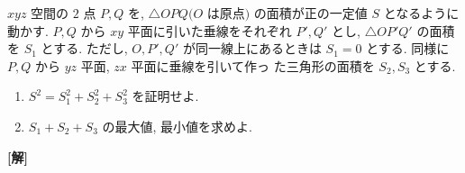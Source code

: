 \documentclass[a4paper,10pt]{ltjsarticle}
\begin{document}
\begin{oframed}
  $xyz$ 空間の $2$ 点 $P, Q$ を, $\triangle OPQ (O$ は原点$)$ の面積が正の一定値 $S$ となるように動かす. $P, Q$ から $xy$ 平面に引いた垂線をそれぞれ $P', Q'$ とし, $\triangle OP'Q'$ の面積を $S_1$ とする. ただし, $O, P', Q'$ が同一線上にあるときは $S_1=0$ とする. 同様に $P, Q$ から $yz$ 平面, $zx$ 平面に垂線を引いて作っ
  た三角形の面積を $S_2, S_3$ とする.
  \begin{enumerate}
    \item $S^2 = S_1^2 + S_2^2 + S_3^2$ を証明せよ.
    \item $S_1+S_2+S_3$ の最大値, 最小値を求めよ.
  \end{enumerate}
\end{oframed}
\setlength{\columnseprule}{0.4pt}
\begin{multicols}{2}
  {\bf[解]}


\end{multicols}
\end{document}
